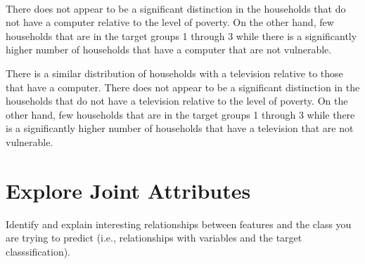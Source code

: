 \documentclass[11pt]{article}
\begin{document}
    \begin{center}
    \end{center}
    { \hspace*{\fill} \\}
    
    There does not appear to be a significant distinction in the households
that do not have a computer relative to the level of poverty. On the
other hand, few households that are in the target groups 1 through 3
while there is a significantly higher number of households that have a
computer that are not vulnerable.

There is a similar distribution of households with a television relative
to those that have a computer. There does not appear to be a significant
distinction in the households that do not have a television relative to
the level of poverty. On the other hand, few households that are in the
target groups 1 through 3 while there is a significantly higher number
of households that have a television that are not vulnerable.

    \section{Explore Joint Attributes}\label{explore-joint-attributes}

Identify and explain interesting relationships between features and the
class you are trying to predict (i.e., relationships with variables and
the target classsification).
\end{document}
